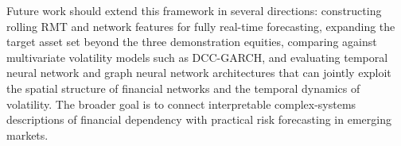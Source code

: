 Future work should extend this framework in several directions: constructing rolling RMT and network features for fully real-time forecasting, expanding the target asset set beyond the three demonstration equities, comparing against multivariate volatility models such as DCC-GARCH, and evaluating temporal neural network and graph neural network architectures that can jointly exploit the spatial structure of financial networks and the temporal dynamics of volatility. The broader goal is to connect interpretable complex-systems descriptions of financial dependency with practical risk forecasting in emerging markets.
